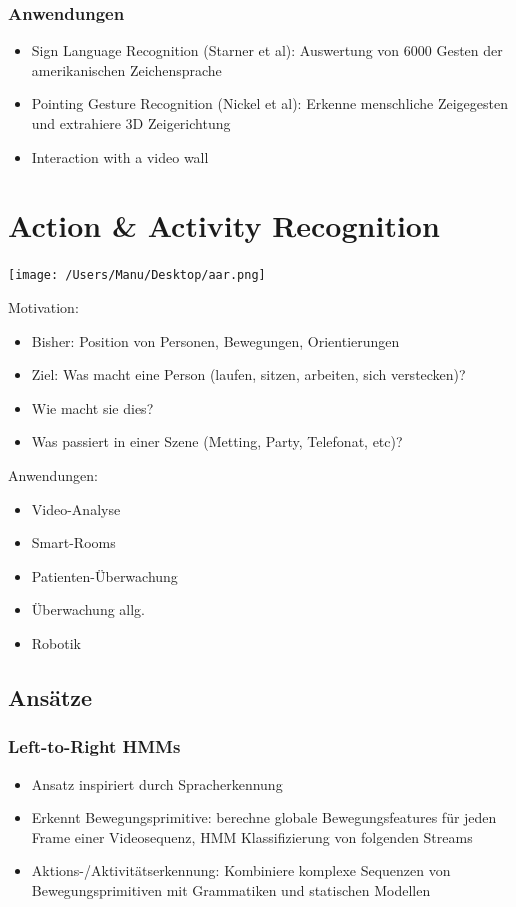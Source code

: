 \documentclass[paper=a4, fontsize=11pt]{scrartcl} %
\numberwithin{equation}{section} %
\numberwithin{figure}{section} %
\numberwithin{table}{section} %
\begin{document}
\subsubsection{Anwendungen}
\begin{itemize}
\item Sign Language Recognition (Starner et al): Auswertung von 6000 Gesten der amerikanischen Zeichensprache
\item Pointing Gesture Recognition (Nickel et al): Erkenne menschliche Zeigegesten und extrahiere 3D Zeigerichtung
\item Interaction with a video wall
\end{itemize}

\section{Action \& Activity Recognition}

\texttt{[image: /Users/Manu/Desktop/aar.png]}

Motivation:
\begin{itemize}
\item Bisher: Position von Personen, Bewegungen, Orientierungen
\item Ziel: Was macht eine Person (laufen, sitzen, arbeiten, sich verstecken)?
\item Wie macht sie dies?
\item Was passiert in einer Szene (Metting, Party, Telefonat, etc)?
\end{itemize}

Anwendungen:
\begin{itemize}
\item Video-Analyse
\item Smart-Rooms
\item Patienten-Überwachung
\item Überwachung allg.
\item Robotik
\end{itemize}

\subsection{Ansätze}
\subsubsection{Left-to-Right HMMs }	

\begin{itemize}
\item Ansatz inspiriert durch Spracherkennung
\item Erkennt Bewegungsprimitive: berechne globale Bewegungsfeatures für jeden Frame einer Videosequenz, HMM Klassifizierung von folgenden Streams
\item Aktions-/Aktivitätserkennung: Kombiniere komplexe Sequenzen von Bewegungsprimitiven mit Grammatiken und statischen Modellen
\end{itemize}
\end{document}

